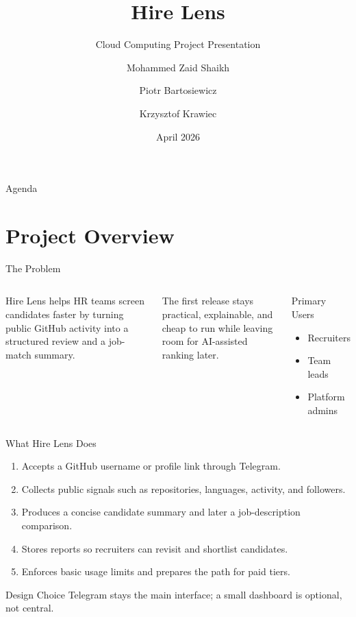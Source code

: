 \documentclass[aspectratio=169]{beamer}
\title[Hire Lens]{Hire Lens}
\subtitle{Cloud Computing Project Presentation}
\author{Mohammed Zaid Shaikh \and Piotr Bartosiewicz \and Krzysztof Krawiec}
\date{April 2026}
\begin{document}
\begin{frame}
  \titlepage
\end{frame}

\begin{frame}{Agenda}
  \tableofcontents
\end{frame}

\section{Project Overview}

\begin{frame}{The Problem}
\begin{columns}[T,onlytextwidth]
  \justifying
  Hire Lens helps HR teams screen candidates faster by turning public GitHub activity into a structured review and a job-match summary.

  \vspace{0.5em}
  The first release stays practical, explainable, and cheap to run while leaving room for AI-assisted ranking later.
  \begin{block}{Primary Users}
    \begin{itemize}
      \item Recruiters
      \item Team leads
      \item Platform admins
    \end{itemize}
  \end{block}
\end{columns}
\end{frame}

\begin{frame}{What Hire Lens Does}
\begin{enumerate}
  \item Accepts a GitHub username or profile link through Telegram.
  \item Collects public signals such as repositories, languages, activity, and followers.
  \item Produces a concise candidate summary and later a job-description comparison.
  \item Stores reports so recruiters can revisit and shortlist candidates.
  \item Enforces basic usage limits and prepares the path for paid tiers.
\end{enumerate}

\vspace{0.5em}
\begin{block}{Design Choice}
Telegram stays the main interface; a small dashboard is optional, not central.
\end{block}
\end{frame}
\end{document}
